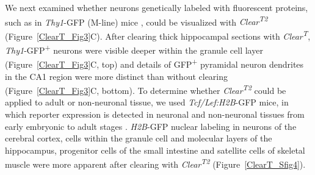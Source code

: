 We next examined whether neurons genetically labeled with fluorescent proteins, such as in \emph{Thy1}-GFP (M-line) mice \cite{feng2000imaging}, could be visualized with \emph{Clear\textsuperscript{T2}} (Figure~\ref{ClearT_Fig3}C).
After clearing thick hippocampal sections with \emph{Clear\textsuperscript{T}}, \emph{Thy1}-GFP\textsuperscript{+} neurons were visible deeper within the granule cell layer (Figure~\ref{ClearT_Fig3}C, top) and details of GFP\textsuperscript{+} pyramidal neuron dendrites in the CA1 region were more distinct than without clearing (Figure~\ref{ClearT_Fig3}C, bottom).
To determine whether \emph{Clear\textsuperscript{T2}} could be applied to adult or non-neuronal tissue, we used \emph{Tcf/Lef:H2B}-GFP mice, in which reporter expression is detected in neuronal and non-neuronal tissues from early embryonic to adult stages \cite{ferrer2010sensitive}.
\emph{H2B}-GFP nuclear labeling in neurons of the cerebral cortex, cells within the granule cell and molecular layers of the hippocampus, progenitor cells of the small intestine and satellite cells of skeletal muscle were more apparent after clearing with \emph{Clear\textsuperscript{T2}} (Figure~\ref{ClearT_Sfig4}).
